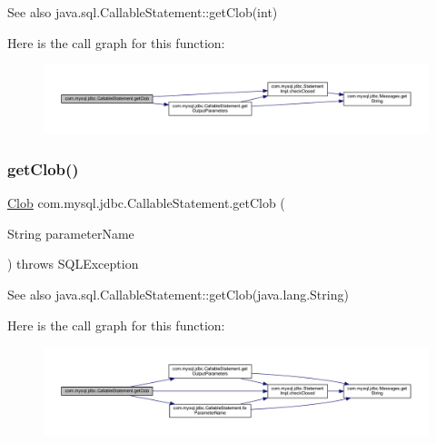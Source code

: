 \begin{DoxySeeAlso}{See also}
java.\+sql.\+Callable\+Statement\+::get\+Clob(int) 
\end{DoxySeeAlso}
Here is the call graph for this function\+:\nopagebreak
\begin{figure}[H]
\begin{center}
\leavevmode
\includegraphics[width=350pt]{classcom_1_1mysql_1_1jdbc_1_1_callable_statement_a86bdc2b6cf993a96d55207239dfbfb86_cgraph}
\end{center}
\end{figure}
\mbox{\label{classcom_1_1mysql_1_1jdbc_1_1_callable_statement_adf34ed70bb4d8cde9bf4e5912c1a6e05}} 
\subsubsection{\texorpdfstring{get\+Clob()}{getClob()}\hspace{0.1cm}{\footnotesize\ttfamily [2/2]}}
{\footnotesize\ttfamily \mbox{\hyperlink{classcom_1_1mysql_1_1jdbc_1_1_clob}{Clob}} com.\+mysql.\+jdbc.\+Callable\+Statement.\+get\+Clob (\begin{DoxyParamCaption}\item[{String}]{parameter\+Name }\end{DoxyParamCaption}) throws S\+Q\+L\+Exception}

\begin{DoxySeeAlso}{See also}
java.\+sql.\+Callable\+Statement\+::get\+Clob(java.\+lang.\+String) 
\end{DoxySeeAlso}
Here is the call graph for this function\+:\nopagebreak
\begin{figure}[H]
\begin{center}
\leavevmode
\includegraphics[width=350pt]{classcom_1_1mysql_1_1jdbc_1_1_callable_statement_adf34ed70bb4d8cde9bf4e5912c1a6e05_cgraph}
\end{center}
\end{figure}
\mbox{\label{classcom_1_1mysql_1_1jdbc_1_1_callable_statement_aa50f27f2049ef5a4d632bf90d49406c3}} 
